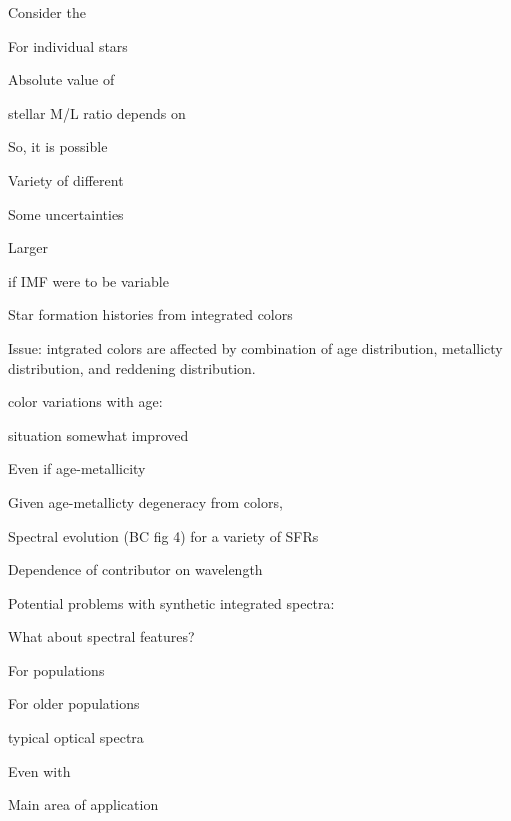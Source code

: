 \documentclass[12pt]{article}
\begin{document}
\begin{itemize*}
            \begin{itemize*}
                \item Consider the
                \item For individual stars
                \item Absolute value of
                \item stellar M/L ratio depends on
                \item So, it is possible
                    \begin{itemize*}
                        \item Variety of different
                        \item Some uncertainties
                        \item Larger
                        \item if IMF were to be variable
                    \end{itemize*}
            \end{itemize*}
        \item Star formation histories from integrated colors
            \begin{itemize*}
                \item Issue: intgrated colors are affected by combination of age
                    distribution,
                    metallicty distribution, and reddening distribution.
                \item color variations with age:
                \item situation somewhat improved
                \item Even if age-metallicity
            \end{itemize*}
        \item Given age-metallicty degeneracy from colors,
        \item Spectral evolution (BC fig 4) for a variety of SFRs
        \item Dependence of contributor on wavelength
        \item Potential problems with synthetic integrated spectra:
        \item What about spectral features?
            \begin{itemize*}
                \item For populations
                \item For older populations
                \item typical optical spectra
            \end{itemize*}
        \item Even with
        \item Main area of application
      \end{itemize*}
\end{document}
